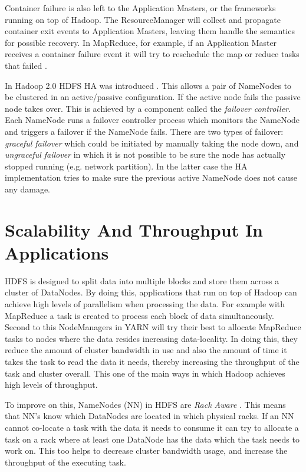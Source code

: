 \documentclass[conference]{IEEEtran}
\begin{document}
Container failure is also left to the Application Masters, or the frameworks running on top of Hadoop. The ResourceManager will collect and propagate container exit events to Application Masters, leaving them handle the semantics for possible recovery. In MapReduce, for example, if an Application Master receives a container failure event it will try to reschedule the map or reduce tasks that failed \cite{yarn}.

In Hadoop 2.0 HDFS HA was introduced \cite{hadoopha}. This allows a pair of NameNodes to be clustered in an active/passive configuration. If the active node fails the passive node takes over. This is achieved by a component called the \emph{failover controller}. Each NameNode runs a failover controller process which monitors the NameNode and triggers a failover if the NameNode fails. There are two types of failover: \emph{graceful failover} which could be initiated by manually taking the node down, and \emph{ungraceful failover} in which it is not possible to be sure the node has actually stopped running (e.g. network partition). In the latter case the HA implementation tries to make sure the previous active NameNode does not cause any damage.

\section{Scalability And Throughput In Applications}
HDFS is designed to split data into multiple blocks and store them across a cluster of DataNodes. By doing this, applications that run on top of Hadoop can achieve high levels of parallelism when processing the data. For example with MapReduce a task is created to process each block of data simultaneously. Second to this NodeManagers in YARN will try their best to allocate MapReduce tasks to nodes where the data resides increasing data-locality. In doing this, they reduce the amount of cluster bandwidth in use and also the amount of time it takes the task to read the data it needs, thereby increasing the throughput of the task and cluster overall. This one of the main ways in which Hadoop achieves high levels of throughput.

To improve on this, NameNodes (NN) in HDFS are \emph{Rack Aware} \cite{rackaware}. This means that NN's know which DataNodes are located in which physical racks. If an NN cannot co-locate a task with the data it needs to consume it can try to allocate a task on a rack where at least one DataNode has the data which the task needs to work on. This too helps to decrease cluster bandwidth usage, and increase the throughput of the executing task.
\end{document}
